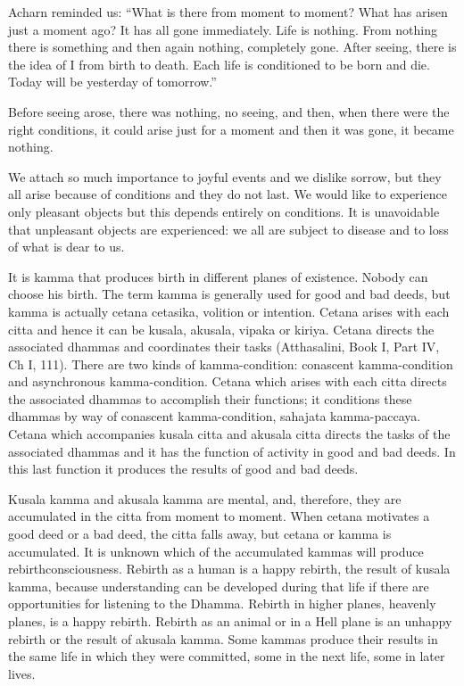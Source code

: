 Acharn reminded us: ``What is there from moment to moment? What has arisen 
just a moment ago? It has all gone immediately. Life is nothing. From nothing 
there is something and then again nothing, completely gone. After seeing, there 
is the idea of I from birth to death. Each life is conditioned to be born and die. 
Today will be yesterday of tomorrow.'' 

Before seeing arose, there was nothing, no seeing, and then, when there were 
the right conditions, it could arise just for a moment and then it was gone, it became nothing. 

We attach so much importance to joyful events and we dislike sorrow, but they 
all arise because of conditions and they do not last. We would like to experience 
only pleasant objects but this depends entirely on conditions. It is unavoidable 
that unpleasant objects are experienced: we all are subject to disease and to loss 
of what is dear to us. 

It is kamma that produces birth in different planes of existence. Nobody can 
choose his birth. The term kamma is generally used for good and bad deeds, but 
kamma is actually cetana cetasika, volition or intention. Cetana arises with each 
citta and hence it can be kusala, akusala, vipaka or kiriya. Cetana directs the associated dhammas and coordinates their tasks (Atthasalini, Book I, Part IV, Ch 
I, 111). There are two kinds of kamma-condition: conascent kamma-condition 
and asynchronous kamma-condition. Cetana which arises with each citta directs 
the associated dhammas to accomplish their functions; it conditions these 
dhammas by way of conascent kamma-condition, sahajata kamma-paccaya. Cetana which accompanies kusala citta and akusala citta directs the tasks of the associated dhammas and it has the function of activity in good and bad deeds. In 
this last function it produces the results of good and bad deeds. 

Kusala kamma and akusala kamma are mental, and, therefore, they are accumulated in the citta from moment to moment. When cetana motivates a good deed 
or a bad deed, the citta falls away, but cetana or kamma is accumulated. It is 
unknown which of the accumulated kammas will produce rebirthconsciousness. Rebirth as a human is a happy rebirth, the result of kusala kamma, because understanding can be developed during that life if there are 
opportunities for listening to the Dhamma. Rebirth in higher planes, heavenly planes, 
is a happy rebirth. Rebirth as an animal or in a Hell plane is an unhappy rebirth 
or the result of akusala kamma. Some kammas produce their results in the same 
life in which they were committed, some in the next life, some in later lives. 

